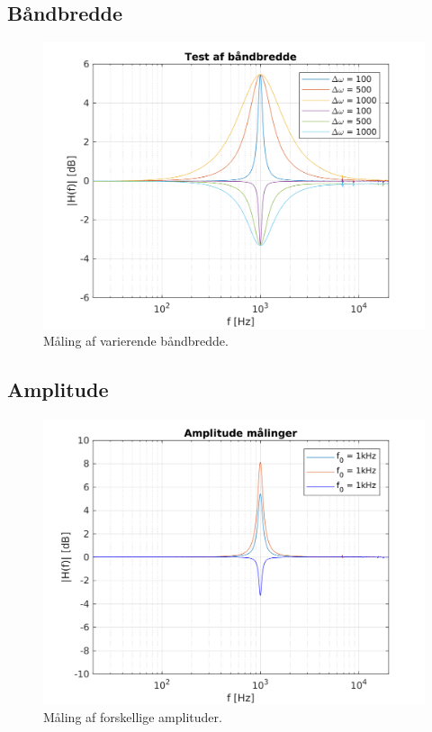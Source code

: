 \subsection{Båndbredde}

\begin{figure}[h]
\centering
\includegraphics[scale = 0.8]{matlabdemo/test/test_bw.png}
\caption{Måling af varierende båndbredde.}
\end{figure}




\subsection{Amplitude}

\begin{figure}[h]
\centering
\includegraphics[scale = 0.8]{matlabdemo/test/test_amp.png}
\caption{Måling af forskellige amplituder.}
\end{figure}


%






